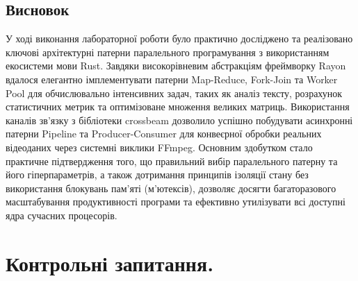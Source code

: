 \documentclass[14pt, a4paper]{extreport}
\begin{document}
	\subsection*{Висновок}
	
	У ході виконання лабораторної роботи було практично досліджено та реалізовано ключові архітектурні патерни паралельного програмування з використанням екосистеми мови Rust. Завдяки високорівневим абстракціям фреймворку Rayon вдалося елегантно імплементувати патерни Map-Reduce, Fork-Join та Worker Pool для обчислювально інтенсивних задач, таких як аналіз тексту, розрахунок статистичних метрик та оптимізоване множення великих матриць. Використання каналів зв'язку з бібліотеки crossbeam дозволило успішно побудувати асинхронні патерни Pipeline та Producer-Consumer для конвеєрної обробки реальних відеоданих через системні виклики FFmpeg. Основним здобутком стало практичне підтвердження того, що правильний вибір паралельного патерну та його гіперпараметрів, а також дотримання принципів ізоляції стану без використання блокувань пам'яті (м'ютексів), дозволяє досягти багаторазового масштабування продуктивності програми та ефективно утилізувати всі доступні ядра сучасних процесорів.
	
	\section*{Контрольні запитання.}
	
\end{document}
